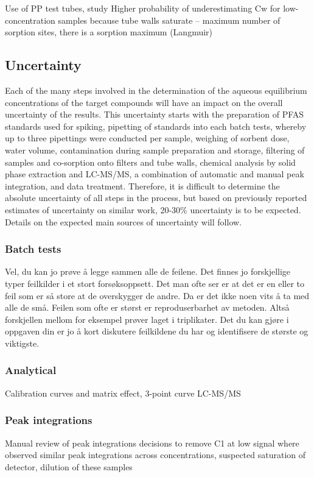 Use of PP test tubes, study
Higher probability of underestimating Cw for low-concentration samples because tube walls saturate – maximum number of sorption sites, there is a sorption maximum (Langmuir)

\subsection{Uncertainty}
Each of the many steps involved in the determination of the aqueous equilibrium concentrations of the target compounds will have an impact on the overall uncertainty of the results. This uncertainty starts with the preparation of PFAS standards used for spiking, pipetting of standards into each batch tests, whereby up to three pipettings were conducted per sample, weighing of sorbent dose, water volume, contamination during sample preparation and storage, filtering of samples and co-sorption onto filters and tube walls, chemical analysis by solid phase extraction and LC-MS/MS, a combination of automatic and manual peak integration, and data treatment. Therefore, it is difficult to determine the absolute uncertainty of all steps in the process, but based on previously reported estimates of uncertainty on similar work, 20-30\% uncertainty is to be expected. Details on the expected main sources of uncertainty will follow.

\subsubsection{Batch tests}
Vel, du kan jo prøve å legge sammen alle de feilene. Det finnes jo forskjellige typer feilkilder i et stort forsøksoppsett. Det man ofte ser er at det er en eller to feil som er så store at de overskygger de andre. Da er det ikke noen vits å ta med alle de små. Feilen som ofte er størst er reproduserbarhet av metoden. Altså forskjellen mellom for eksempel prøver laget i triplikater. Det du kan gjøre i oppgaven din er jo å kort diskutere feilkildene du har og identifisere de største og viktigste.

\subsubsection{Analytical}
Calibration curves and matrix effect, 3-point curve
LC-MS/MS

\subsubsection{Peak integrations}
Manual review of peak integrations
decisions to remove C1 at low signal
where observed similar peak integrations across concentrations, suspected saturation of detector, dilution of these samples